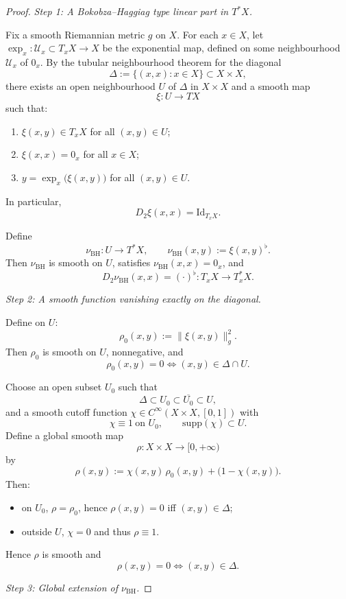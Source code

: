 \documentclass[10pt,a4paper]{amsart}
\begin{document}
\begin{proof}
\emph{Step 1: A Bokobza--Haggiag type linear part in $T^\ast X$.}

Fix a smooth Riemannian metric $g$ on $X$.  
For each $x\in X$, let $\exp_x : \mathcal U_x \subset T_xX \to X$ be the 
exponential map, defined on some neighbourhood $\mathcal U_x$ of $0_x$.
By the tubular neighbourhood theorem for the diagonal
\[
\Delta := \{(x,x) : x\in X\} \subset X\times X,
\]
there exists an open neighbourhood $U$ of $\Delta$ in $X\times X$ and
a smooth map
\[
\xi : U \longrightarrow TX
\]
such that:
\begin{enumerate}
  \item $\xi(x,y)\in T_xX$ for all $(x,y)\in U$;
  \item $\xi(x,x) = 0_x$ for all $x\in X$;
  \item $y = \exp_x\bigl(\xi(x,y)\bigr)$ for all $(x,y)\in U$.
\end{enumerate}
In particular,
\[
D_2\xi(x,x) = \mathrm{Id}_{T_xX}.
\]

Define
\[
\nu_{\mathrm{BH}} : U \longrightarrow T^\ast X,
\qquad
\nu_{\mathrm{BH}}(x,y) := \xi(x,y)^\flat.
\]
Then $\nu_{\mathrm{BH}}$ is smooth on $U$, satisfies
$\nu_{\mathrm{BH}}(x,x)=0_x$, and
\[
D_2\nu_{\mathrm{BH}}(x,x)
= (\cdot)^\flat : T_xX \to T_x^\ast X.
\]

\medskip
\noindent
\emph{Step 2: A smooth function vanishing exactly on the diagonal.}

Define on $U$:
\[
\rho_0(x,y) := \|\xi(x,y)\|_g^2.
\]
Then $\rho_0$ is smooth on $U$, nonnegative, and
\[
\rho_0(x,y) = 0 \Longleftrightarrow (x,y)\in \Delta \cap U.
\]

Choose an open subset $U_0$ such that
\[
\Delta \subset U_0 \subset \overline{U_0} \subset U,
\]
and a smooth cutoff function 
$\chi\in C^\infty(X\times X,[0,1])$ with
\[
\chi \equiv 1 \ \text{on } U_0,
\qquad
\mathrm{supp}(\chi)\subset U.
\]
Define a global smooth map
\[
\rho : X\times X \longrightarrow [0,+\infty)
\]
by
\[
\rho(x,y)
:= \chi(x,y)\,\rho_0(x,y) + \bigl(1-\chi(x,y)\bigr).
\]
Then:
\begin{itemize}
  \item on $U_0$, $\rho=\rho_0$, hence $\rho(x,y)=0$ iff $(x,y)\in\Delta$;
  \item outside $U$, $\chi=0$ and thus $\rho\equiv 1$.
\end{itemize}
Hence $\rho$ is smooth and
\[
\rho(x,y)=0 \Longleftrightarrow (x,y)\in\Delta.
\]

\medskip
\noindent
\emph{Step 3: Global extension of $\nu_{\mathrm{BH}}$.}


\end{proof}
\end{document}
